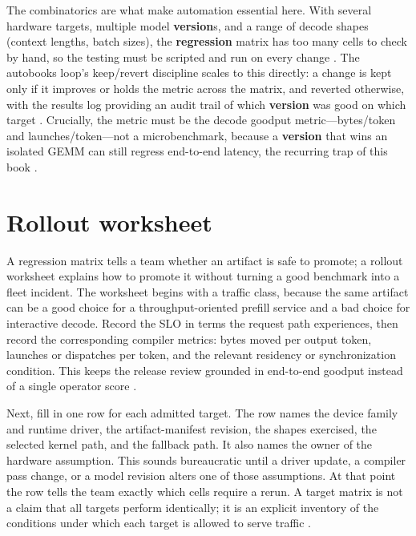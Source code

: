 The combinatorics are what make automation essential here. With several hardware targets, multiple model \textbf{version}s, and a range of decode shapes (context lengths, batch sizes), the \textbf{regression} matrix has too many cells to check by hand, so the testing must be scripted and run on every change \citep{patel2025llminference}. The autobooks loop's keep/revert discipline scales to this directly: a change is kept only if it improves or holds the metric across the matrix, and reverted otherwise, with the results log providing an audit trail of which \textbf{version} was good on which target \citep{yirage2026,taxbreak2026}. Crucially, the metric must be the decode goodput metric---bytes/token and launches/token---not a microbenchmark, because a \textbf{version} that wins an isolated GEMM can still regress end-to-end latency, the recurring trap of this book \citep{memoryfloor2026}.

\section{Rollout worksheet}
\label{sec:ch24_rollout_worksheet}

A regression matrix tells a team whether an artifact is safe to promote; a rollout worksheet explains how to promote it without turning a good benchmark into a fleet incident. The worksheet begins with a traffic class, because the same artifact can be a good choice for a throughput-oriented prefill service and a bad choice for interactive decode. Record the SLO in terms the request path experiences, then record the corresponding compiler metrics: bytes moved per output token, launches or dispatches per token, and the relevant residency or synchronization condition. This keeps the release review grounded in end-to-end goodput instead of a single operator score \citep{memoryfloor2026,taxbreak2026}.

Next, fill in one row for each admitted target. The row names the device family and runtime driver, the artifact-manifest revision, the shapes exercised, the selected kernel path, and the fallback path. It also names the owner of the hardware assumption. This sounds bureaucratic until a driver update, a compiler pass change, or a model revision alters one of those assumptions. At that point the row tells the team exactly which cells require a rerun. A target matrix is not a claim that all targets perform identically; it is an explicit inventory of the conditions under which each target is allowed to serve traffic \citep{iree2024,patel2025llminference}.

